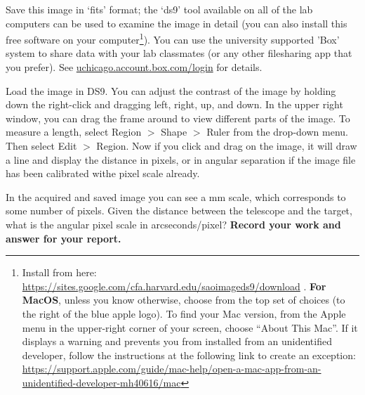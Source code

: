 \begin{steps}
	\item Save this image in ‘fits’ format; the ‘ds9’ tool available on all of the lab
	computers can be used to examine the image in detail (you can also install this free software on your computer\footnote{Install from here: \url{https://sites.google.com/cfa.harvard.edu/saoimageds9/download} . \textbf{For MacOS}, unless you know otherwise, choose from the top set of choices (to the right of
		the blue apple logo). To find your Mac version, from the Apple menu in the upper-right corner of your screen,
		choose “About This Mac”. If it displays a warning and prevents you from installed from an unidentified developer, follow the instructions at the following link to create an exception: \url{https://support.apple.com/guide/mac-help/open-a-mac-app-from-an-unidentified-developer-mh40616/mac}}). You can use the university supported
	’Box’ system to share data with your lab classmates (or any other filesharing app that you prefer). See \url{uchicago.account.box.com/login}
	for details.
	
%	

	\item Load the image in DS9. You can adjust the contrast of the image by holding down the right-click and dragging left, right, up, and down. In the upper right window, you can drag the frame around to view different parts of the image. To measure a length, select Region $>$ Shape $>$ Ruler from the drop-down menu. Then select Edit $>$ Region. Now if you click and drag on the image, it will draw a line and display the distance in pixels, or in angular separation if the image file has been calibrated withe pixel scale already.
	
	\item In the acquired and saved image you can see a mm scale, which corresponds to some number
	of pixels. Given the distance between the
	telescope and the target, what is the angular pixel scale in arcseconds/pixel? \textbf{Record your work and answer for your report.}
	

\end{steps}
